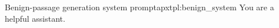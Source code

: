 \begin{apxtemplate}{Benign-passage generation system prompt}{apxtpl:benign_system}
You are a helpful assistant.
\end{apxtemplate}
